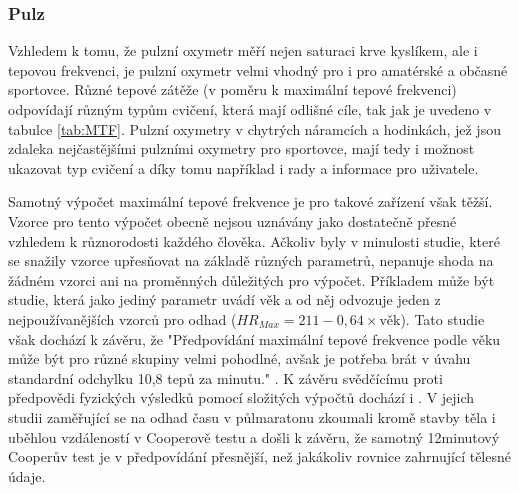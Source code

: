\subsubsection {Pulz}
Vzhledem k tomu, že pulzní oxymetr měří nejen saturaci krve kyslíkem, ale i tepovou frekvenci, je pulzní oxymetr velmi vhodný pro i pro amatérské a občasné sportovce. Různé tepové zátěže (v poměru k maximální tepové frekvenci) odpovídají různým typům cvičení, která mají odlišné cíle, tak jak je uvedeno v tabulce \ref{tab:MTF}. Pulzní oxymetry v chytrých náramcích a hodinkách, jež jsou zdaleka nejčastějšími pulzními oxymetry pro sportovce, mají tedy i možnost ukazovat typ cvičení a díky tomu například i rady a informace pro uživatele.
\par Samotný výpočet maximální tepové frekvence je pro takové zařízení však těžší. Vzorce pro tento výpočet obecně nejsou uznávány jako dostatečně přesné vzhledem k různorodosti každého člověka. Ačkoliv byly v minulosti studie, které se snažily vzorce upřesňovat na základě různých parametrů, nepanuje shoda na žádném vzorci ani na proměnných důležitých pro výpočet. Příkladem může být studie, která jako jediný parametr uvádí věk a od něj odvozuje jeden z nejpoužívanějších vzorců pro odhad ($HR_{Max}=211-0,64\times\text{věk}$). Tato studie však dochází k závěru, že "Předpovídání maximální tepové frekvence podle věku může být pro různé skupiny velmi pohodlné, avšak je potřeba brát v úvahu standardní odchylku 10,8 tepů za minutu." \citep{maxHR}. K závěru svědčícímu proti předpovědi fyzických výsledků pomocí složitých výpočtů dochází i \cite{Cooper}. V jejich studii zaměřující se na odhad času v půlmaratonu zkoumali kromě stavby těla i  uběhlou vzdáleností v Cooperově testu a došli k závěru, že samotný 12minutový Cooperův test je v předpovídání přesnější, než jakákoliv rovnice zahrnující tělesné údaje.

